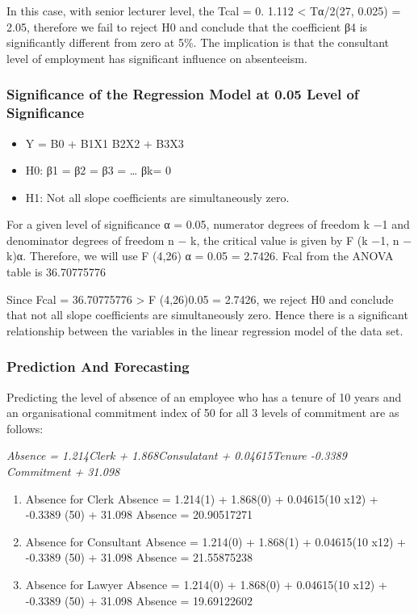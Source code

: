 \documentclass[
]{article}
\providecommand{\tightlist}{%
  \setlength{\itemsep}{0pt}\setlength{\parskip}{0pt}}
\begin{document}
In this case, with senior lecturer level, the \textbar Tcal\textbar{} =
0. 1.112 \textless{} Tα/2(27, 0.025) = 2.05, therefore we fail to reject
H0 and conclude that the coefficient β4 is significantly different from
zero at 5\%. The implication is that the consultant level of employment
has significant influence on absenteeism.

\hypertarget{significance-of-the-regression-model-at-0.05-level-of-significance}{%
\subsubsection{Significance of the Regression Model at 0.05 Level of
Significance}\label{significance-of-the-regression-model-at-0.05-level-of-significance}}

\begin{itemize}
\tightlist
\item
  Y = Β0 + Β1X1 B2X2 + B3X3
\item
  H0: β1 = β2 = β3 = \ldots{} βk= 0
\item
  H1: Not all slope coefficients are simultaneously zero.
\end{itemize}

For a given level of significance α = 0.05, numerator degrees of freedom
k −1 and denominator degrees of freedom n − k, the critical value is
given by F (k −1, n − k)α. Therefore, we will use F (4,26) α = 0.05 =
2.7426. Fcal from the ANOVA table is 36.70775776

Since Fcal = 36.70775776 \textgreater{} F (4,26)0.05 = 2.7426, we reject
H0 and conclude that not all slope coefficients are simultaneously zero.
Hence there is a significant relationship between the variables in the
linear regression model of the data set.

\hypertarget{prediction-and-forecasting}{%
\subsubsection{Prediction And
Forecasting}\label{prediction-and-forecasting}}

Predicting the level of absence of an employee who has a tenure of 10
years and an organisational commitment index of 50 for all 3 levels of
commitment are as follows:

\emph{Absence = 1.214Clerk + 1.868Consulatant + 0.04615Tenure -0.3389
Commitment + 31.098}

\begin{enumerate}
\def\labelenumi{\alph{enumi})}
\item
  Absence for Clerk Absence = 1.214(1) + 1.868(0) + 0.04615(10 x12) +
  -0.3389 (50) + 31.098 Absence = 20.90517271
\item
  Absence for Consultant Absence = 1.214(0) + 1.868(1) + 0.04615(10 x12)
  + -0.3389 (50) + 31.098 Absence = 21.55875238
\item
  Absence for Lawyer Absence = 1.214(0) + 1.868(0) + 0.04615(10 x12) +
  -0.3389 (50) + 31.098 Absence = 19.69122602
\end{enumerate}
\end{document}
